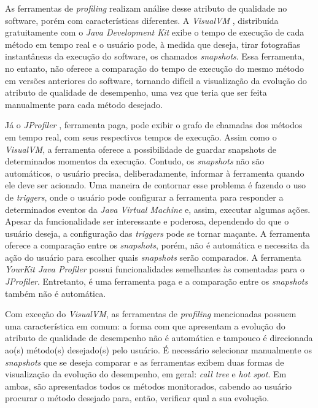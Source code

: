 As ferramentas de \textit{profiling} realizam análise desse atributo de qualidade no software, porém com características diferentes. A \textit{VisualVM} \cite{Vis}, distribuída gratuitamente com o \textit{Java Development Kit} exibe o tempo de execução de cada método em tempo real e o usuário pode, à medida que deseja, tirar fotografias instantâneas da execução do software, os chamados \textit{snapshots}. Essa ferramenta, no entanto, não oferece a comparação do tempo de execução do mesmo método em versões anteriores do software, tornando difícil a visualização da evolução do atributo de qualidade de desempenho, uma vez que teria que ser feita manualmente para cada método desejado.

Já o \textit{JProfiler} \cite{JProfiler}, ferramenta paga, pode exibir o grafo de chamadas dos métodos em tempo real, com seus respectivos tempos de execução. Assim como o \textit{VisualVM}, a ferramenta oferece a possibilidade de guardar snapshots de determinados momentos da execução. Contudo, os \textit{snapshots} não são automáticos, o usuário precisa, deliberadamente, informar à ferramenta quando ele deve ser acionado. Uma maneira de contornar esse problema é fazendo o uso de \textit{triggers}, onde o usuário pode configurar a ferramenta para responder a determinados eventos da \textit{Java Virtual Machine}  e, assim, executar algumas ações. Apesar da funcionalidade ser interessante e poderosa, dependendo do que o usuário deseja, a configuração das \textit{triggers} pode se tornar maçante. A ferramenta oferece a comparação entre os \textit{snapshots}, porém, não é automática e necessita da ação do usuário para escolher quais \textit{snapshots} serão comparados. A ferramenta \textit{YourKit Java Profiler} \cite{Profiler2016} possui funcionalidades semelhantes às comentadas para o \textit{JProfiler}. Entretanto, é uma ferramenta paga e a comparação entre os \textit{snapshots} também não é automática.

Com exceção do \textit{VisualVM}, as ferramentas de \textit{profiling} mencionadas possuem uma característica em comum: a forma com que apresentam a evolução do atributo de qualidade de desempenho não é automática e tampouco é direcionada ao(s) método(s) desejado(s) pelo usuário. É necessário selecionar manualmente os \textit{snapshots} que se deseja comparar e as ferramentas exibem duas formas de visualização da evolução do desempenho, em geral: \textit{call tree} e \textit{hot spot}. Em ambas, são apresentados todos os métodos monitorados, cabendo ao usuário procurar o método desejado para, então, verificar qual a sua evolução.


